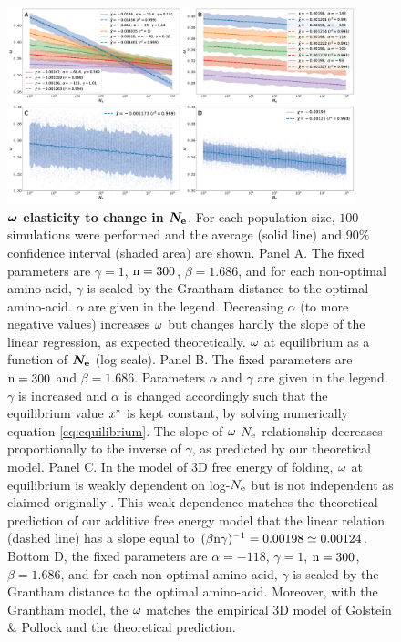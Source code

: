 \documentclass{article}
\begin{document}
	\begin{figure}[htb!]
		\begin{mdframed}
			\centering
			\includegraphics[width=0.9\textwidth] {artworks/Elasticity.png}
			\caption{
				\textbf{$\bm{\omega}$ elasticity to change in $\bm{N_{\mathrm{e}}}$}.
				For each population size, $100$ simulations were performed and the average (solid line) and $90\%$ confidence interval (shaded area) are shown.
				Panel A. The fixed parameters are $\gamma=1$, $\text{n}=300$, $\beta=1.686$, and for each non-optimal amino-acid, $\gamma$ is scaled by the Grantham distance to the optimal amino-acid. $\alpha$ are given in the legend. Decreasing $\alpha$ (to more negative values) increases $\omega$ but changes hardly the slope of the linear regression, as expected theoretically.
				$\omega$ at equilibrium as a function of $\bm{N_{\mathrm{e}}}$ (log scale).
				Panel B. The fixed parameters are $\text{n}=300$ and $\beta=1.686$. Parameters $\alpha$ and $\gamma$ are given in the legend.
				$\gamma$ is increased and $\alpha$ is changed accordingly such that the equilibrium value $x^{*}$ is kept constant, by solving numerically equation \ref{eq:equilibrium}.
				The slope of $\omega$-$N_{\mathrm{e}}$ relationship decreases proportionally to the inverse of $\gamma$, as predicted by our theoretical model.
				Panel C. In the model of 3D free energy of folding, $\omega$ at equilibrium is weakly dependent on log-$N_{\mathrm{e}}$ but is not independent as claimed originally \cite{Goldstein2013}.
				This weak dependence matches the theoretical prediction of our additive free energy model that the linear relation (dashed line) has a slope equal to $(\beta \text{n} \gamma)^{-1} = 0.00198 \simeq 0.00124$.
				Bottom D, the fixed parameters are $\alpha=-118$, $\gamma=1$, $\text{n}=300$, $\beta=1.686$, and for each non-optimal amino-acid, $\gamma$ is scaled by the Grantham distance to the optimal amino-acid.
				Moreover, with the Grantham model, the $\omega$ matches the empirical 3D model of Golstein \& Pollock and the theoretical prediction.
				\label{fig:GoldsteinVsToy}
			}
		\end{mdframed}
	\end{figure}
\end{document}

